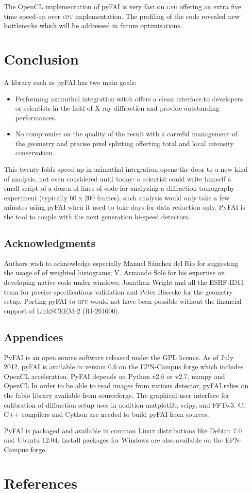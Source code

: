 \documentclass[a4paper]{jpconf}
\begin{document}
The OpenCL implementation of pyFAI is very fast on \textsc{gpu} offering an extra five
time speed-up over \textsc{cpu} implementation. The profiling of the code revealed new
bottlenecks which will be addressed in future optimisations.

\section{Conclusion}

A library such as pyFAI has two main goals:
\begin{itemize}
\item Performing azimuthal integration witch offers a clean interface to
developers or scientists in the field of X-ray diffraction and provide outstanding performances.
\item No compromise on the quality of the result with a carreful management of
the geometry and precise pixel splitting offerting total and local intensity
conservation.
\end{itemize}

This twenty folds speed up in azimuthal integration opens the door to a new
kind of analysis, not even considered until today: a scientist could write
himself a small script of a dozen of lines of code for analyzing a diffraction
tomography experiment (typically 60 x 200 frames), such analysis would only
take a few minutes using pyFAI when it used to take days for data reduction only.
PyFAI is the tool to couple with the next generation hi-speed detectors.

\subsection*{Acknowledgments}
Authors wish to acknowledge especially Manuel S\'anchez del R\'io for suggesting
the usage of of weighted histograms;
V. Armando Sol\'e for his expertise on developing native code under windows;
Jonathan Wright and all the ESRF-ID11 team for precise specifications validation
and Peter B\"osecke for the geometry setup. Porting pyFAI
to \textsc{gpu} would not have been possible without the financial support of LinkSCEEM-2 (RI-261600).

\subsection*{Appendices}
PyFAI is an open source software released under the GPL licence.
As of July 2012, pyFAI is available in version 0.6 on the EPN-Campus
forge\cite{forge} which includes OpenCL acceleration.
PyFAI depends on Python v2.6 or v2.7, numpy\cite{numpy} and OpenCL\cite{opencl}
In order to be able to read images from various detector, pyFAI relies on the
fabio\cite{fabio} library available from sourceforge. The graphical user
interface for calibration of diffraction setup uses in addition
matplotlib\cite{matplotlib}, scipy\cite{scipy}, and FFTw3\cite{fftw}.
C, C++ compilers and Cython\cite{cython} are needed to build pyFAI from
sources.

PyFAI is packaged and available in common Linux distributions like Debian
7.0 and Ubuntu 12.04. Install packages for Windows are also
available on the EPN-Campus forge.

 \section*{References}


\end{document}
